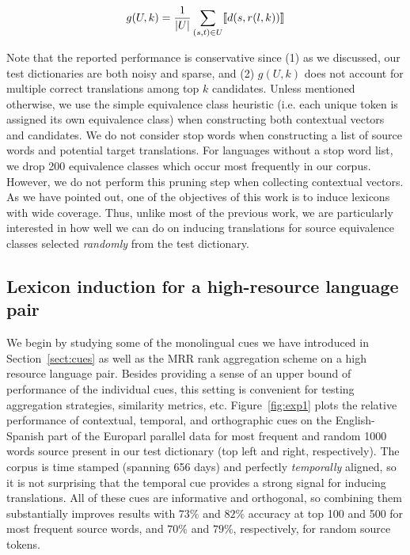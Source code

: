 \documentclass{article}
\newcommand{\secref}[1]{Section~\ref{#1}}
\newcommand{\figref}[1]{Figure~\ref{#1}}
\begin{document}
\begin{equation}
  g(U, k) = {1 \over |U|}\sum_{(s,t) \in U} \llbracket d(s, r(l, k))\rrbracket
\end{equation}

Note that the reported performance is conservative since (1) as we discussed, our test dictionaries are both noisy and sparse, and (2) $g(U, k)$ does not account for multiple correct translations among top $k$ candidates. Unless mentioned otherwise, we use the simple equivalence class heuristic (i.e. each unique token is assigned its own equivalence class) when constructing both contextual vectors and candidates.  We do not consider stop words when constructing a list of source words and potential target translations.  For languages without a stop word list, we drop 200 equivalence classes which occur most frequently in our corpus.  However, we do not perform this pruning step when collecting contextual vectors. \\

As we have pointed out, one of the objectives of this work is to induce lexicons with wide coverage.  Thus, unlike most of the previous work, we are particularly interested in how well we can do on inducing translations for source equivalence classes selected \emph{randomly} from the test dictionary.

\subsection{Lexicon induction for a high-resource language pair} \label{sect:exphigh}

We begin by studying some of the monolingual cues we have introduced in \secref{sect:cues} as well as the MRR rank aggregation scheme on a high resource language pair.  Besides providing a sense of an upper bound of performance of the individual cues, this setting is convenient for testing aggregation strategies, similarity metrics, etc.  \figref{fig:exp1} plots the relative performance of contextual, temporal, and orthographic cues on the English-Spanish part of the Europarl parallel data for most frequent and random 1000 words source present in our test dictionary (top left and right, respectively).  The corpus is time stamped (spanning 656 days) and perfectly \emph{temporally} aligned, so it is not surprising that the temporal cue provides a strong signal for inducing translations.  All of these cues are informative and orthogonal, so combining them substantially improves results with $73\%$ and  $82\%$ accuracy at top 100 and 500 for most frequent source words, and $70\%$ and  $79\%$, respectively, for random source tokens.  \\
\end{document}
